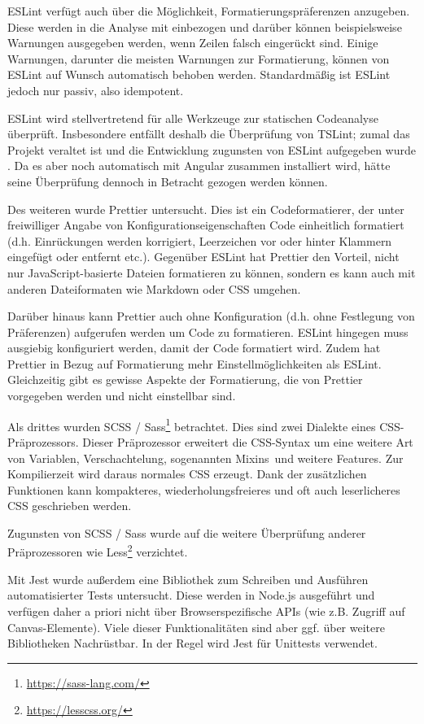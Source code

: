 ESLint verfügt auch über die Möglichkeit, Formatierungspräferenzen anzugeben. Diese werden in die Analyse mit einbezogen und darüber können beispielsweise Warnungen ausgegeben werden, wenn Zeilen falsch eingerückt sind. Einige Warnungen, darunter die meisten Warnungen zur Formatierung, können von ESLint auf Wunsch automatisch behoben werden. Standardmäßig ist ESLint jedoch nur passiv, also idempotent.

ESLint wird stellvertretend für alle Werkzeuge zur statischen Codeanalyse überprüft. Insbesondere entfällt deshalb die Überprüfung von TSLint; zumal das Projekt veraltet ist und die Entwicklung zugunsten von ESLint aufgegeben wurde \cite{tslint_deprecation} \cite{tslint_repo}. Da es aber noch automatisch mit Angular zusammen installiert wird, hätte seine Überprüfung dennoch in Betracht gezogen werden können.

Des weiteren wurde Prettier untersucht. Dies ist ein Codeformatierer, der unter freiwilliger Angabe von Konfigurationseigenschaften Code einheitlich formatiert (d.h. Einrückungen werden korrigiert, Leerzeichen vor oder hinter Klammern eingefügt oder entfernt etc.). Gegenüber ESLint hat Prettier den Vorteil, nicht nur JavaScript-basierte Dateien formatieren zu können, sondern es kann auch mit anderen Dateiformaten wie Markdown oder CSS umgehen.

Darüber hinaus kann Prettier auch ohne Konfiguration (d.h. ohne Festlegung von Präferenzen) aufgerufen werden um Code zu formatieren. ESLint hingegen muss ausgiebig konfiguriert werden, damit der Code formatiert wird. Zudem hat Prettier in Bezug auf Formatierung mehr Einstellmöglichkeiten als ESLint. Gleichzeitig gibt es gewisse Aspekte der Formatierung, die von Prettier vorgegeben werden und nicht einstellbar sind.

Als drittes wurden SCSS / Sass\footnote{\url{https://sass-lang.com/}} betrachtet. Dies sind zwei Dialekte eines CSS-Präprozessors. Dieser Präprozessor erweitert die CSS-Syntax um eine weitere Art von Variablen, Verschachtelung, sogenannten \glqq Mixins\grqq\ und weitere Features. Zur Kompilierzeit wird daraus normales CSS erzeugt. Dank der zusätzlichen Funktionen kann kompakteres, wiederholungsfreieres und oft auch leserlicheres CSS geschrieben werden.

Zugunsten von SCSS / Sass wurde auf die weitere Überprüfung anderer Präprozessoren wie Less\footnote{\url{https://lesscss.org/}} verzichtet.

Mit Jest wurde außerdem eine Bibliothek zum Schreiben und Ausführen automatisierter Tests untersucht. Diese werden in Node.js ausgeführt und verfügen daher a priori nicht über Browserspezifische APIs (wie z.B. Zugriff auf Canvas-Elemente). Viele dieser Funktionalitäten sind aber ggf. über weitere Bibliotheken Nachrüstbar. In der Regel wird Jest für Unittests verwendet.

